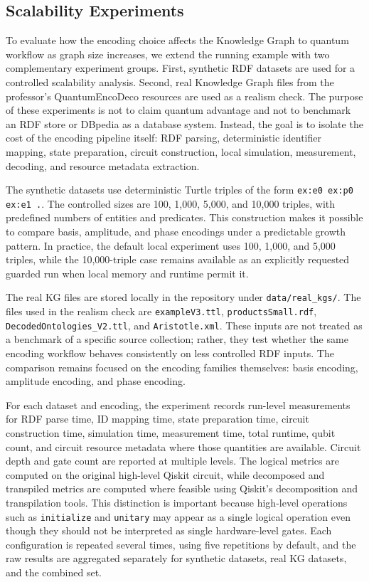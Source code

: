 \subsection{Scalability Experiments}

To evaluate how the encoding choice affects the Knowledge Graph to quantum
workflow as graph size increases, we extend the running example with two
complementary experiment groups. First, synthetic RDF datasets are used for a
controlled scalability analysis. Second, real Knowledge Graph files from the
professor's QuantumEncoDeco resources are used as a realism check. The purpose
of these experiments is not to claim quantum advantage and not to benchmark an
RDF store or DBpedia as a database system. Instead, the goal is to isolate the
cost of the encoding pipeline itself: RDF parsing, deterministic identifier
mapping, state preparation, circuit construction, local simulation, measurement,
decoding, and resource metadata extraction.

The synthetic datasets use deterministic Turtle triples of the form
\texttt{ex:e0 ex:p0 ex:e1 .}. The controlled sizes are 100, 1,000, 5,000, and
10,000 triples, with predefined numbers of entities and predicates. This
construction makes it possible to compare basis, amplitude, and phase encodings
under a predictable growth pattern. In practice, the default local experiment
uses 100, 1,000, and 5,000 triples, while the 10,000-triple case remains
available as an explicitly requested guarded run when local memory and runtime
permit it.

The real KG files are stored locally in the repository under
\texttt{data/real\_kgs/}. The files used in the realism check are
\texttt{exampleV3.ttl}, \texttt{productsSmall.rdf},
\texttt{DecodedOntologies\_V2.ttl}, and \texttt{Aristotle.xml}. These inputs are
not treated as a benchmark of a specific source collection; rather, they test
whether the same encoding workflow behaves consistently on less controlled RDF
inputs. The comparison remains focused on the encoding families themselves:
basis encoding, amplitude encoding, and phase encoding.

For each dataset and encoding, the experiment records run-level measurements for
RDF parse time, ID mapping time, state preparation time, circuit construction
time, simulation time, measurement time, total runtime, qubit count, and circuit
resource metadata where those quantities are available. Circuit depth and gate
count are reported at multiple levels. The logical metrics are computed on the
original high-level Qiskit circuit, while decomposed and transpiled metrics are
computed where feasible using Qiskit's decomposition and transpilation tools.
This distinction is important because high-level operations such as
\texttt{initialize} and \texttt{unitary} may appear as a single logical
operation even though they should not be interpreted as single hardware-level
gates. Each configuration is repeated several times, using five repetitions by
default, and the raw results are aggregated separately for synthetic datasets,
real KG datasets, and the combined set.

